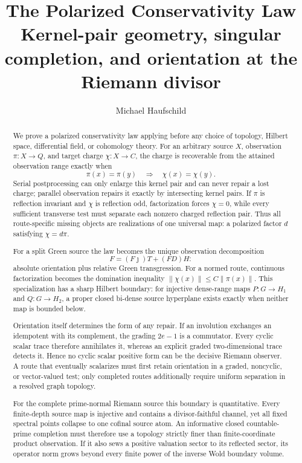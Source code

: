 \documentclass[11pt]{article}
\title{\textbf{The Polarized Conservativity Law}\\
\large Kernel-pair geometry, singular completion, and orientation at the Riemann divisor}
\author{Michael Haufschild}
\date{}
\theoremstyle{definition}
\theoremstyle{remark}
\begin{document}
\maketitle

\begin{abstract}
We prove a polarized conservativity law applying before any choice of
topology, Hilbert space, differential field, or cohomology theory.  For an
arbitrary source \(X\), observation \(\pi:X\to Q\), and target charge
\(\chi:X\to C\), the charge is recoverable from the attained observation
range exactly when
\[
       \pi(x)=\pi(y)\quad\Longrightarrow\quad\chi(x)=\chi(y).
\]
Serial postprocessing can only enlarge this kernel pair and can never repair
a lost charge; parallel observation repairs it exactly by intersecting
kernel pairs.  If \(\pi\) is reflection invariant and \(\chi\) is
reflection odd, factorization forces \(\chi=0\), while every sufficient
transverse test must separate each nonzero charged reflection pair.  Thus
all route-specific missing objects are realizations of one universal map: a
polarized factor \(d\) satisfying \(\chi=d\pi\).

For a split Green source the law becomes the unique observation decomposition
\[
 F=(F\jmath)T+(FD)H:
\]
absolute orientation plus relative Green transgression.  For a normed route,
continuous factorization becomes the domination inequality
\(\|\chi(x)\|\le C\|\pi(x)\|\).  This specialization has a sharp Hilbert
boundary: for injective dense-range maps \(P:G\to H_1\) and
\(Q:G\to H_2\), a proper closed bi-dense source hyperplane exists exactly
when neither map is bounded below.

Orientation itself determines the form of any repair.  If an involution
exchanges an idempotent with its complement, the grading \(2e-1\) is a
commutator.  Every cyclic scalar trace therefore annihilates it, whereas an
explicit graded two-dimensional trace detects it.  Hence no cyclic scalar
positive form can be the decisive Riemann observer.  A route that eventually
scalarizes must first retain orientation in a graded, noncyclic, or
vector-valued test; only completed routes additionally require uniform
separation in a resolved graph topology.

For the complete prime-normal Riemann source this boundary is quantitative.
Every finite-depth source map is injective and contains a divisor-faithful
channel, yet all fixed spectral points collapse to one cofinal source atom.
An informative closed countable-prime completion must therefore use a
topology strictly finer than finite-coordinate product observation.  If it
also sews a positive valuation sector to its reflected sector, its operator
norm grows beyond every finite power of the inverse Wold boundary volume.


\end{abstract}
\end{document}
